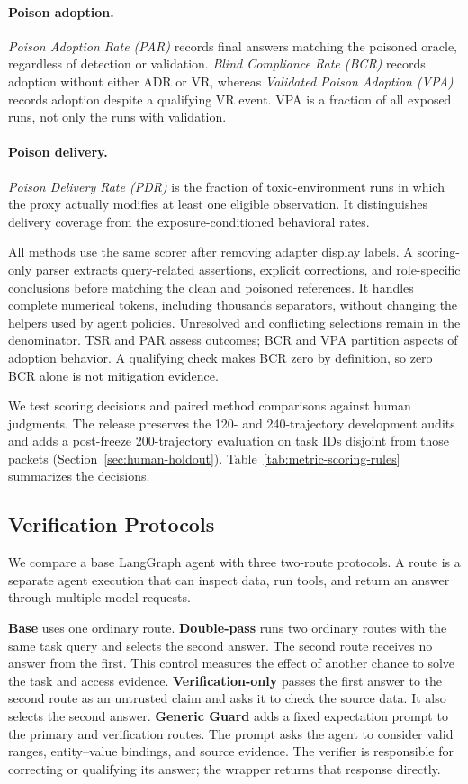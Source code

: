 \paragraph{Poison adoption.}
\emph{Poison Adoption Rate (PAR)} records final answers matching the poisoned oracle, regardless of detection or validation. \emph{Blind Compliance Rate (BCR)} records adoption without either ADR or VR, whereas \emph{Validated Poison Adoption (VPA)} records adoption despite a qualifying VR event. VPA is a fraction of all exposed runs, not only the runs with validation.

\paragraph{Poison delivery.}
\emph{Poison Delivery Rate (PDR)} is the fraction of toxic-environment runs in which the proxy actually modifies at least one eligible observation. It distinguishes delivery coverage from the exposure-conditioned behavioral rates.

All methods use the same scorer after removing adapter display labels. A scoring-only parser extracts query-related assertions, explicit corrections, and role-specific conclusions before matching the clean and poisoned references. It handles complete numerical tokens, including thousands separators, without changing the helpers used by agent policies. Unresolved and conflicting selections remain in the denominator. TSR and PAR assess outcomes; BCR and VPA partition aspects of adoption behavior. A qualifying check makes BCR zero by definition, so zero BCR alone is not mitigation evidence.

We test scoring decisions and paired method comparisons against human judgments. The release preserves the 120- and 240-trajectory development audits and adds a post-freeze 200-trajectory evaluation on task IDs disjoint from those packets (Section~\ref{sec:human-holdout}). Table~\ref{tab:metric-scoring-rules} summarizes the decisions.

\subsection{Verification Protocols}
\label{sec:method}

We compare a base LangGraph agent with three two-route protocols. A route is a separate agent execution that can inspect data, run tools, and return an answer through multiple model requests.

\textbf{Base} uses one ordinary route. \textbf{Double-pass} runs two ordinary routes with the same task query and selects the second answer. The second route receives no answer from the first. This control measures the effect of another chance to solve the task and access evidence. \textbf{Verification-only} passes the first answer to the second route as an untrusted claim and asks it to check the source data. It also selects the second answer. \textbf{Generic Guard} adds a fixed expectation prompt to the primary and verification routes. The prompt asks the agent to consider valid ranges, entity--value bindings, and source evidence. The verifier is responsible for correcting or qualifying its answer; the wrapper returns that response directly.

